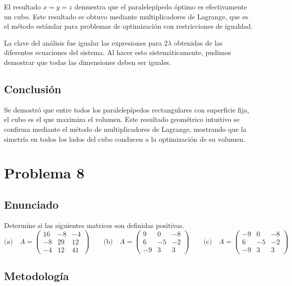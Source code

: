 \documentclass{article}
\begin{document}
El resultado $x = y = z$ demuestra que el paralelepípedo óptimo es efectivamente un cubo. Este resultado se obtuvo mediante multiplicadores de Lagrange, que es el método estándar para problemas de optimización con restricciones de igualdad.

La clave del análisis fue igualar las expresiones para $2\lambda$ obtenidas de las diferentes ecuaciones del sistema. Al hacer esto sistemáticamente, pudimos demostrar que todas las dimensiones deben ser iguales.

\subsection{Conclusión}

Se demostró que entre todos los paralelepípedos rectangulares con superficie fija, el cubo es el que maximiza el volumen. Este resultado geométrico intuitivo se confirma mediante el método de multiplicadores de Lagrange, mostrando que la simetría en todos los lados del cubo conducen a la optimización de su volumen.

\section{Problema 8}

\subsection{Enunciado}
Determine si las siguientes matrices son definidas positivas.
\[
\text{(a)}\quad
A=\begin{pmatrix}
16 & -8 & -4\\
-8 & 29 & 12\\
-4 & 12 & 41
\end{pmatrix}
\qquad
\text{(b)}\quad
A=\begin{pmatrix}
9 & 0 & -8\\
6 & -5 & -2\\
-9 & 3 & 3
\end{pmatrix}
\qquad
\text{(c)}\quad
A=\begin{pmatrix}
-9 & 0 & -8\\
6 & -5 & -2\\
-9 & 3 & 3
\end{pmatrix}
\]

\subsection{Metodología}
\end{document}
